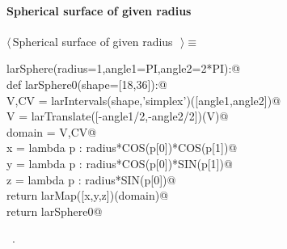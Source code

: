 \documentclass[11pt,oneside]{article}	%
\begin{document}
\paragraph{Spherical surface of given radius}
\begin{flushleft} \small \label{scrap12}
$\langle\,$Spherical surface of given radius\nobreak\ {\footnotesize {}}$\,\rangle\equiv$
\vspace{-1ex}
\begin{list}{}{} \item
\mbox{}\verb@def larSphere(radius=1,angle1=PI,angle2=2*PI):@\\
\mbox{}\verb@   def larSphere0(shape=[18,36]):@\\
\mbox{}\verb@      V,CV = larIntervals(shape,'simplex')([angle1,angle2])@\\
\mbox{}\verb@      V = larTranslate([-angle1/2,-angle2/2])(V)@\\
\mbox{}\verb@      domain = V,CV@\\
\mbox{}\verb@      x = lambda p : radius*COS(p[0])*COS(p[1])@\\
\mbox{}\verb@      y = lambda p : radius*COS(p[0])*SIN(p[1])@\\
\mbox{}\verb@      z = lambda p : radius*SIN(p[0])@\\
\mbox{}\verb@      return larMap([x,y,z])(domain)@\\
\mbox{}\verb@   return larSphere0@\\
\mbox{}\verb@@{\NWsep}
\end{list}
\vspace{-1ex}
\footnotesize\addtolength{\baselineskip}{-1ex}
\begin{list}{}{\setlength{\itemsep}{-\parsep}\setlength{\itemindent}{-\leftmargin}}
\item \NWtxtMacroRefIn\ .
\end{list}
\end{flushleft}
\end{document}

